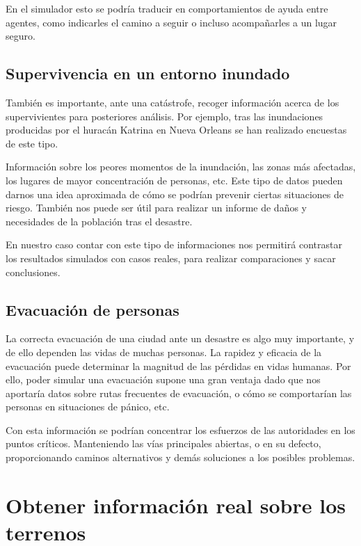 En el simulador esto se podría traducir en comportamientos de ayuda entre
agentes, como indicarles el camino a seguir o incluso acompañarles a un
lugar seguro.

\subsection*{Supervivencia en un entorno inundado}

También es importante, ante una catástrofe, recoger información acerca de los
supervivientes para posteriores análisis. Por ejemplo, tras las inundaciones
producidas por el huracán Katrina en Nueva Orleans se han realizado
encuestas\cite{Washington05} de este tipo.

Información sobre los peores momentos de la inundación, las zonas más afectadas,
los lugares de mayor concentración de personas, etc. Este tipo de datos pueden
darnos una idea aproximada de cómo se podrían prevenir ciertas situaciones de
riesgo. También nos puede ser útil para realizar un informe de daños y
necesidades de la población tras el desastre.

En nuestro caso contar con este tipo de informaciones nos permitirá contrastar
los resultados simulados con casos reales, para realizar comparaciones y sacar
conclusiones.

\subsection*{Evacuación de personas}

La correcta evacuación de una ciudad ante un desastre es algo muy importante, y
de ello dependen las vidas de muchas personas. La rapidez y eficacia de la
evacuación puede determinar la magnitud de las pérdidas en vidas humanas. Por
ello, poder simular una evacuación supone una gran ventaja dado que nos
aportaría datos sobre rutas frecuentes de evacuación\cite{Lammel08}, o cómo se
comportarían las personas en situaciones de pánico\cite{Chu05}, etc.

Con esta información se podrían concentrar los esfuerzos de las autoridades en
los puntos críticos. Manteniendo las vías principales abiertas, o en su defecto,
proporcionando caminos alternativos y demás soluciones a los posibles problemas.

\section*{Obtener información real sobre los terrenos}

